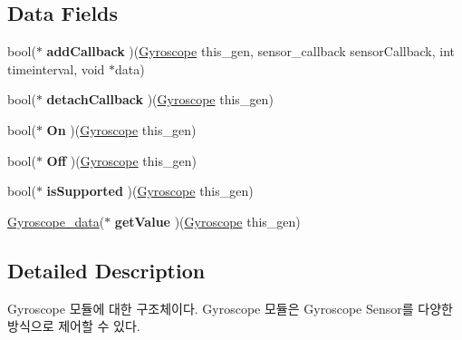 \subsection*{Data Fields}
\begin{DoxyCompactItemize}
\item 
\hypertarget{struct__Gyroscope_a8ed204dd4cf27c9ed2995c2f54a39dc3}{bool($\ast$ {\bfseries add\-Callback} )(\hyperlink{struct__Gyroscope}{Gyroscope} this\-\_\-gen, sensor\-\_\-callback sensor\-Callback, int timeinterval, void $\ast$data)}\label{struct__Gyroscope_a8ed204dd4cf27c9ed2995c2f54a39dc3}

\item 
\hypertarget{struct__Gyroscope_a8563723f9f86ef959ae1209f2fbf7645}{bool($\ast$ {\bfseries detach\-Callback} )(\hyperlink{struct__Gyroscope}{Gyroscope} this\-\_\-gen)}\label{struct__Gyroscope_a8563723f9f86ef959ae1209f2fbf7645}

\item 
\hypertarget{struct__Gyroscope_a65cf092766f15c09f9e052d4e9932869}{bool($\ast$ {\bfseries On} )(\hyperlink{struct__Gyroscope}{Gyroscope} this\-\_\-gen)}\label{struct__Gyroscope_a65cf092766f15c09f9e052d4e9932869}

\item 
\hypertarget{struct__Gyroscope_afe811258869c9f8b112ea029df3d1fae}{bool($\ast$ {\bfseries Off} )(\hyperlink{struct__Gyroscope}{Gyroscope} this\-\_\-gen)}\label{struct__Gyroscope_afe811258869c9f8b112ea029df3d1fae}

\item 
\hypertarget{struct__Gyroscope_ac0f373cd10a93722406c823688676dee}{bool($\ast$ {\bfseries is\-Supported} )(\hyperlink{struct__Gyroscope}{Gyroscope} this\-\_\-gen)}\label{struct__Gyroscope_ac0f373cd10a93722406c823688676dee}

\item 
\hypertarget{struct__Gyroscope_a9e5519a135ce1a2b58d7e21fd2d53171}{\hyperlink{Sensor_8h_df/d29/struct__3d__data}{Gyroscope\-\_\-data}($\ast$ {\bfseries get\-Value} )(\hyperlink{struct__Gyroscope}{Gyroscope} this\-\_\-gen)}\label{struct__Gyroscope_a9e5519a135ce1a2b58d7e21fd2d53171}

\end{DoxyCompactItemize}


\subsection{Detailed Description}
Gyroscope 모듈에 대한 구조체이다. Gyroscope 모듈은 Gyroscope Sensor를 다양한 방식으로 제어할 수 있다. 

